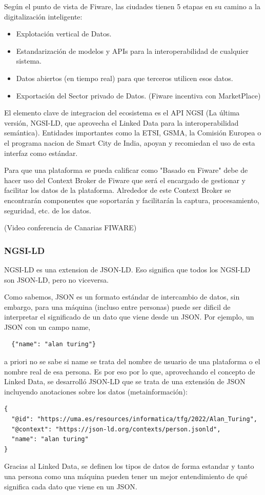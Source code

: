 \documentclass[12pt, a4paper, twoside]{article}
\begin{document}
Según el punto de vista de Fiware, las ciudades tienen 5 etapas en su camino a la digitalización inteligente:
\begin{itemize}
  \item Explotación vertical de Datos.
  \item Estandarización de modelos y APIs para la interoperabilidad de cualquier sistema.
  \item Datos abiertos (en tiempo real) para que terceros utilicen esos datos.
  \item Exportación del Sector privado de Datos. (Fiware incentiva con MarketPlace)
\end{itemize}

El elemento clave de integracion del ecosistema es el API NGSI 
(La última versión, NGSI-LD, que aprovecha el Linked Data para la 
interoperabilidad semántica). Entidades importantes como
la ETSI, GSMA, la Comisión Europea o el programa nacion de 
Smart City de India, apoyan y recomiedan el uso de esta interfaz como estándar.

Para que una plataforma se pueda calificar como "Basado en Fiware" debe de hacer uso
del Context Broker de Fiware que será el encargado de gestionar y facilitar los datos
de la plataforma. Alrededor de este Context Broker se encontrarán componentes que 
soportarán y facilitarán la captura, procesamiento, seguridad, etc. de los datos.

(Video conferencia de Canarias FIWARE)

\subsubsection{NGSI-LD}
NGSI-LD es una extension de JSON-LD. Eso significa que todos los NGSI-LD son JSON-LD,
pero no viceversa.

Como sabemos, JSON es un formato estándar de intercambio de datos, sin embargo, para
una máquina (incluso entre personas) puede ser dificil de interpretar el significado
de un dato que viene desde un JSON. Por ejemplo, un JSON con un campo name,
\begin{lstlisting}
  {"name": "alan turing"}
\end{lstlisting}
a priori no se sabe si name se trata del nombre de usuario de una plataforma o el 
nombre real de esa persona. Es por eso por lo que, aprovechando el concepto de
Linked Data, se desarrolló JSON-LD que se trata de una 
extensión de JSON incluyendo anotaciones sobre los datos (metainformación):
\begin{lstlisting}
{
  "@id": "https://uma.es/resources/informatica/tfg/2022/Alan_Turing",
  "@context": "https://json-ld.org/contexts/person.jsonld",
  "name": "alan turing"
}
\end{lstlisting}
Gracias al Linked Data, se definen los tipos de datos de forma estandar y tanto una 
persona como una máquina pueden tener un mejor entendimiento de qué significa cada dato
que viene en un JSON.
\end{document}
